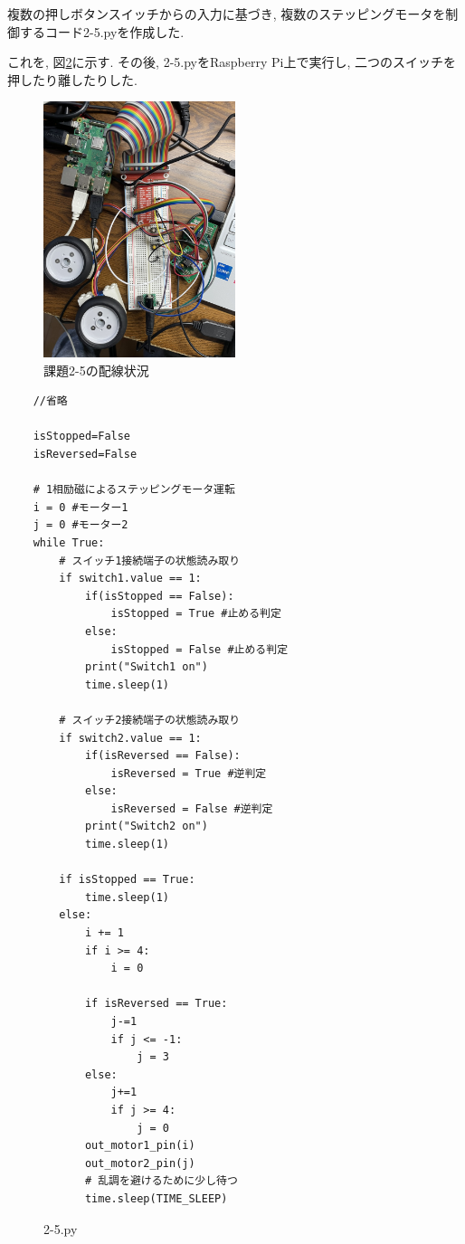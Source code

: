 \documentclass{ltjsarticle} %
\begin{document}
複数の押しボタンスイッチからの⼊⼒に基づき, 複数のステッピングモータを制御するコード2-5.pyを作成した. 

これを, 図\ref{fig:2-5py}に示す.
その後, 2-5.pyをRaspberry Pi上で実行し, 二つのスイッチを押したり離したりした. 

\begin{figure}[H] %
  \centering
  \includegraphics[width=0.5\textwidth]{raspi2-5.JPEG} %
  \caption{課題2-5の配線状況} %
  \label{fig:raspi2-5} %
\end{figure}

\begin{mdframed}
  \begin{verbatim}
    //省略

    isStopped=False
    isReversed=False
    
    # 1相励磁によるステッピングモータ運転
    i = 0 #モーター1
    j = 0 #モーター2
    while True:
        # スイッチ1接続端⼦の状態読み取り
        if switch1.value == 1:
            if(isStopped == False):
                isStopped = True #止める判定
            else:
                isStopped = False #止める判定        
            print("Switch1 on")
            time.sleep(1)
    
        # スイッチ2接続端⼦の状態読み取り    
        if switch2.value == 1: 
            if(isReversed == False):
                isReversed = True #逆判定
            else:
                isReversed = False #逆判定    
            print("Switch2 on")
            time.sleep(1)
    
        if isStopped == True:
            time.sleep(1)
        else:
            i += 1
            if i >= 4:
                i = 0
    
            if isReversed == True:
                j-=1
                if j <= -1:
                    j = 3
            else:
                j+=1
                if j >= 4:
                    j = 0
            out_motor1_pin(i)
            out_motor2_pin(j)
            # 乱調を避けるために少し待つ
            time.sleep(TIME_SLEEP)	
  \end{verbatim}
  \end{mdframed}
  \begin{figure}[H]
  \caption{2-5.py}
  \label{fig:2-5py}
  \end{figure}
\end{document}
